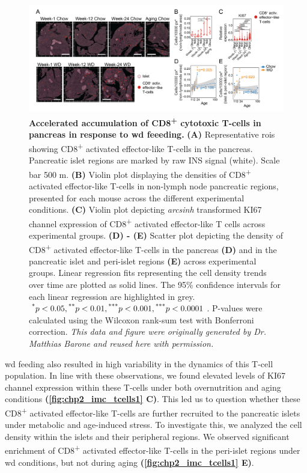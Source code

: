 \begin{figure}[b!]
\centering
\includegraphics[width=\linewidth]{Chapter4/Fig/F2-10-02.png}
\caption[Accelerated accumulation of CD8\textsuperscript{+} cytotoxic T-cells in pancreas]{\textbf{Accelerated accumulation of CD8\textsuperscript{+} cytotoxic T-cells in pancreas in response to \gls{wd} feeeding.} \textbf{(A)} Representative \glspl{roi} showing CD8\textsuperscript{+} activated effector-like T-cells in the pancreas. Pancreatic islet regions are marked by raw INS signal (white).  Scale bar 500 \textmu m. \textbf{(B)} Violin plot displaying the densities of CD8\textsuperscript{+} activated effector-like T-cells in non-lymph node pancreatic regions, presented for each mouse across the different experimental conditions. \textbf{(C)} Violin plot depicting \textit{arcsinh} transformed KI67 channel expression of CD8\textsuperscript{+} activated effector-like T cells across experimental groups. \textbf{(D) - (E)} Scatter plot depicting the density of CD8\textsuperscript{+} activated effector-like T-cells in the pancreas \textbf{(D)} and in the pancreatic islet and peri-islet regions \textbf{(E)} across experimental groups. Linear regression fits representing the cell density trends over time are plotted as solid lines. The 95\% confidence intervals for each linear regression are highlighted in grey. $\textsuperscript{*} p < 0.05, \textsuperscript{**} p < 0.01, \textsuperscript{***} p < 0.001, \textsuperscript{***} p < 0.0001$. P-values were calculated using the Wilcoxon rank-sum test with Bonferroni correction. \textit{This data and figure were originally generated by Dr. Matthias Barone and reused here with permission.}}
\label{fig:chp2_imc_tcells1}
\end{figure}

\clearpage

\gls{wd} feeding also resulted in high variability in the dynamics of this T-cell population. In line with these observations, we found elevated levels of KI67 channel expression within these T-cells under both overnutrition and aging conditions \textbf{(\autoref{fig:chp2_imc_tcells1} C)}. This led us to question whether these CD8\textsuperscript{+} activated effector-like T-cells are further recruited to the pancreatic islets under metabolic and age-induced stress. To investigate this, we analyzed the cell density within the islets and their peripheral regions. We observed significant enrichment of CD8\textsuperscript{+} activated effector-like T-cells in the peri-islet regions under \gls{wd} conditions, but not during aging \textbf{(\autoref{fig:chp2_imc_tcells1} E)}.\\

